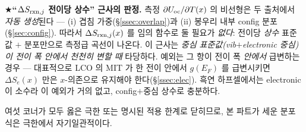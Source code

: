 \begin{keybox}
★\textbf{``$\Delta S_{\mathrm{rxn},j}$ 전이당 상수'' 근사의 판정.} 측정 $\partial U_{\mathrm{oc}}/\partial T(x)$ 의 비선형은 두
출처에서 \emph{자동 생성}된다 --- (i) 겹침 가중(\S\ref{ssec:overlap})과 (ii) 봉우리 내부 config 분포
(\S\ref{sec:config}). 따라서 $\Delta S_{\mathrm{rxn},j}(x)$ 를 임의 함수로 둘 필요가 \emph{없다}: 전이당 \emph{상수}
표준값 $+$ 분포만으로 측정급 곡선이 나온다. 이 근사는 \emph{중심 표준값(vib$+$electronic 중심)이 전이 폭 안에서
천천히 변할 때} 타당하다. 예외는 그 항이 전이 폭 \emph{안에서} 급변하는 경우 --- 대표적으로 LCO 의 MIT 가 한
전이 안에서 $g(E_F)$ 를 급변시키면 $\Delta S_e(x)$ 만은 $x$-의존으로 유지해야 한다(\S\ref{ssec:elec}). 흑연
하프셀에서는 electronic 이 소수라 이 예외가 거의 없고, config$+$중심 상수로 충분하다.
\end{keybox}

여섯 코너가 모두 옳은 극한 또는 명시된 적용 한계로 닫히므로, 본 파트가 세운 분포 식은 극한에서 자기일관적이다.

